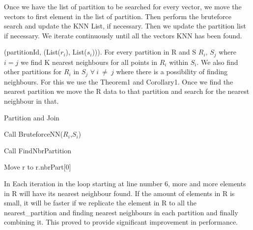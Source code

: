 Once we have the list of partition to be searched for every vector, we
move the vectors to first element in the list of partition. Then
perform the bruteforce search and update the KNN List, if
necessary. Then we update the partition list if necessary. We iterate
continuously until all the vectors KNN has been found.

(partitionId,
(List($r_i$), List($s_i$))). For every partition in R and S $R_i$,
$S_j$ where $i=j$ we find K nearest neighbours for all points in
$R_i$ within $S_i$. We also find other partitions for $R_i$ in $S_j$
$\forall\ i\ \neq\ j$ where there is a possibility of finding
neighbours. For this we use the Theorem1 and Corollary1.
Once we find the nearest partition we move the R data to that partition
and search for the nearest neighbour in that.

\begin{algorithm}
  \caption{Partition and Join}
  \label{algo_join}
  \begin{algorithmic}[1]
    \REPEAT

    \STATE Call BruteforceNN($R_i$,$S_i$)
    \ENDFOR

    \STATE Call FindNbrPartition

    \STATE Move r to r.nbrPart[0]
    \ENDFOR


  \end{algorithmic}
\end{algorithm}

\bigskip

In Each iteration in the loop starting at line number 6, more and more elements in R will have its nearest
neighbour found. If the amount of elements in R is small, it will be
faster if we replicate the element in R to all the nearest\_partition
and finding nearest neighbours in each partition and finally combining
it. This proved to provide significant improvement in performance.

\bigskip

